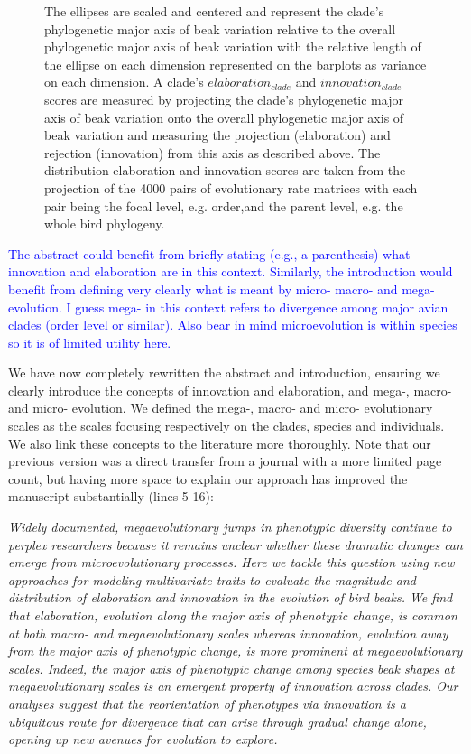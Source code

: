 \documentclass[12pt,letterpaper]{article}
\begin{document}
\begin{figure}[!htbp]
{{The ellipses are scaled and centered and represent the clade's phylogenetic major axis of beak variation relative to the overall phylogenetic major axis of beak variation with the relative length of the ellipse on each dimension represented on the barplots as variance on each dimension.
A clade's $elaboration_{clade}$ and $innovation_{clade}$ scores are measured by projecting the clade's phylogenetic major axis of beak variation onto the overall phylogenetic major axis of beak variation and measuring the projection (elaboration) and rejection (innovation) from this axis as described above.
The distribution elaboration and innovation scores are taken from the projection of the 4000 pairs of evolutionary rate matrices with each pair being the focal level, e.g. order,and the parent level, e.g. the whole bird phylogeny.}}
\label{Fig:cheatsheet}
\end{figure}

\newpage

\textcolor{blue}{The abstract could benefit from briefly stating (e.g., a parenthesis) what innovation and elaboration are in this context. Similarly, the introduction would benefit from defining very clearly what is meant by micro- macro- and mega-evolution. I guess mega- in this context refers to divergence among major avian clades (order level or similar). Also bear in mind microevolution is within species so it is of limited utility here.}

We have now completely rewritten the abstract and introduction, ensuring we clearly introduce the concepts of innovation and elaboration, and mega-, macro- and micro- evolution. We defined the mega-, macro- and micro- evolutionary scales as the scales focusing respectively on the clades, species and individuals. We also link these concepts to the literature more thoroughly. Note that our previous version was a direct transfer from a journal with a more limited page count, but having more space to explain our approach has improved the manuscript substantially (lines 5-16):

\noindent\textit{Widely documented, megaevolutionary jumps in phenotypic diversity continue to perplex researchers because it remains unclear whether these dramatic changes can emerge from microevolutionary processes.
Here we tackle this question using new approaches for modeling multivariate traits %
 to evaluate the magnitude and distribution of elaboration and innovation in the evolution of bird beaks.
We find that elaboration, evolution along the major axis of phenotypic change, is common at both macro- and megaevolutionary scales whereas innovation, evolution away from the major axis of phenotypic change, is more prominent at megaevolutionary scales.
Indeed, the major axis of phenotypic change among species beak shapes at megaevolutionary scales is an emergent property of innovation across clades.
Our analyses suggest that the reorientation of phenotypes via innovation is a ubiquitous route for divergence that can arise through gradual change alone, opening up new avenues for evolution to explore.}
\end{document}
